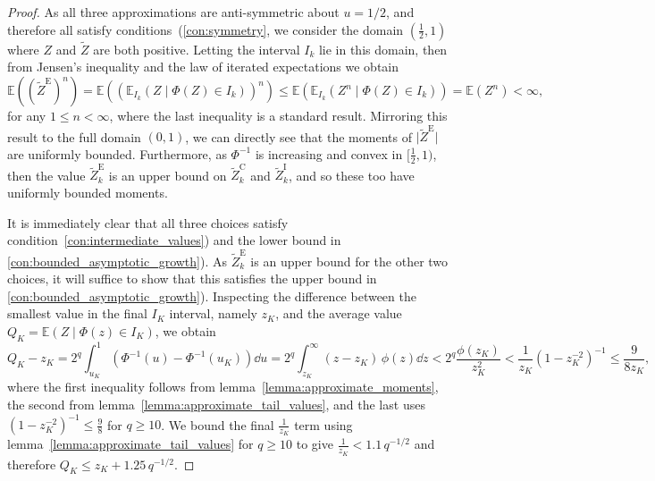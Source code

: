 \documentclass[9pt,a4paper,english]{extarticle}
\begin{document}
\begin{proof}
As all three approximations are anti-symmetric about $u = 1/2$, and therefore all satisfy conditions~(\ref{con:symmetry}, we consider the domain $ (\tfrac{1}{2}, 1) $ where $ Z $ and $ \widetilde{Z} $ are both positive. Letting the interval $ I_k $ lie in this domain, then from Jensen's inequality and the law of iterated expectations we obtain 
\begin{equation*}
\mathbb{E}((\widetilde{Z}^{\mathrm{E}})^n) = \mathbb{E}((\mathbb{E}_{I_k}(Z \mid \Phi(Z) \in I_k))^n) \leq \mathbb{E}(\mathbb{E}_{I_k}(Z^n \mid \Phi(Z) \in I_k)) =  \mathbb{E}(Z^n) < \infty,
\end{equation*}
for any $ 1\leq n < \infty $, where the last inequality is a standard result. Mirroring this result to the full domain $ (0, 1) $, we can directly see that the moments of $ \lvert \widetilde{Z}^{\mathrm{E}} \rvert $ are uniformly bounded. Furthermore, as $ \Phi^{-1} $ is increasing and convex in $ [\tfrac{1}{2}, 1) $, then the value $ \widetilde{Z}_k^\mathrm{E} $ is an upper bound on $ \widetilde{Z}_k^\mathrm{C} $ and $ \widetilde{Z}_k^\mathrm{I} $, and so these too have uniformly bounded moments.

It is immediately clear that all three choices satisfy condition~\ref{con:intermediate_values}) and the lower bound in \ref{con:bounded_asymptotic_growth}). As $ \widetilde{Z}_k^\mathrm{E} $ is an upper bound for the other two choices, it will suffice to show that this satisfies the upper bound in \ref{con:bounded_asymptotic_growth}). Inspecting the difference between the smallest value in the final $ I_K $ interval, namely $ z_K $, and the average value $ Q_K = \mathbb{E}(Z \mid \Phi(z) \in I_K) $, we obtain
\begin{equation*}
Q_K - z_K = 2^q \int_{u_K}^{1} \left(\Phi^{-1}(u) - \Phi^{-1}(u_K)\right) \dd{u} = 2^q \int_{z_K}^{\infty} (z - z_K)\, \phi(z) \dd{z} <  2^q \dfrac{\phi(z_K)}{z_K^2} < \dfrac{1}{z_K} (1 - z_K^{-2})^{-1} \leq \dfrac{9}{8 z_K},
\end{equation*}
where the first inequality follows from lemma~\ref{lemma:approximate_moments}, the second from lemma~\ref{lemma:approximate_tail_values}, and the last uses $ (1 - z_K^{-2})^{-1} \leq \tfrac{9}{8} $ for $ q \geq 10 $. We bound the final $ \tfrac{1}{z_K} $ term using lemma~\ref{lemma:approximate_tail_values} for $q\geq  10$ to give $ \tfrac{1}{z_K} < 1.1 \, q^{-1/2}$ 
and therefore $ Q_K \leq z_K + 1.25 \,q^{-1/2} $. \qedhere
\end{proof}
\end{document}
